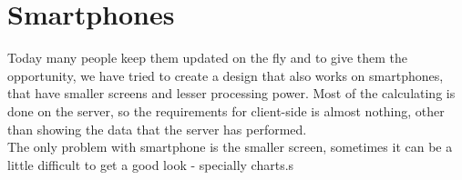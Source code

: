 \chapter{Smartphones}
Today many people keep them updated on the fly and to give them the opportunity, we have tried to create a design that also works on smartphones, that have smaller screens and lesser processing power. Most of the calculating is done on the server, so the requirements for client-side is almost nothing, other than showing the data that the server has performed.\\
The only problem with smartphone is the smaller screen, sometimes it can be a little difficult to get a good look - specially charts.s